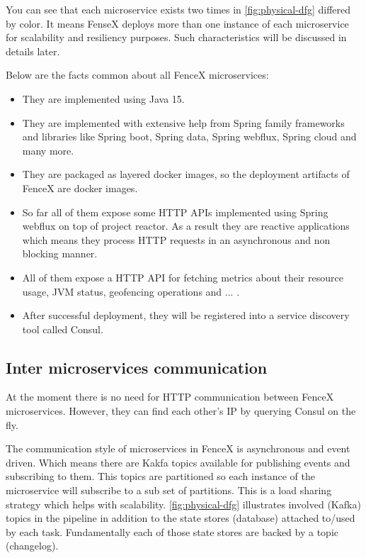 \documentclass[a4]{report}
\begin{document}
        You can see that each microservice exists two times in \ref{fig:physical-dfg} differed by color.
        It means FenseX deploys more than one instance of each microservice for scalability and resiliency purposes.
        Such characteristics will be discussed in details later.

        Below are the facts common about all FenceX microservices:
        \begin{itemize}
            \item They are implemented using Java 15.
            \item They are implemented with extensive help from Spring family frameworks and libraries like Spring boot, Spring data, Spring webflux, Spring cloud and many more.
            \item They are packaged as layered docker images, so the deployment artifacts of FenceX are docker images.
            \item So far all of them expose some HTTP APIs implemented using Spring webflux on top of project reactor. As
            a result they are reactive applications which means they process HTTP requests in an asynchronous and non blocking manner.
            \item All of them expose a HTTP API for fetching metrics about their resource usage, JVM status, geofencing operations and ... .
            \item After successful deployment, they will be registered into a service discovery tool called Consul\cite{Consul}.
        \end{itemize}

        \subsection{Inter microservices communication}
        At the moment there is no need for HTTP communication between FenceX microservices.
        However, they can find each other's IP by querying Consul on the fly.

        The communication style of microservices in FenceX is asynchronous and event driven.
        Which means there are Kakfa topics available for publishing events and subscribing to them.
        This topics are partitioned so each instance of the microservice will subscribe to a sub set of partitions.
        This is a load sharing strategy which helps with scalability.
        \ref{fig:physical-dfg} illustrates involved (Kafka) topics in the pipeline in addition to the state stores
        (database) attached to/used by each task.
        Fundamentally each of those state stores are backed by a topic (changelog).
\end{document}
